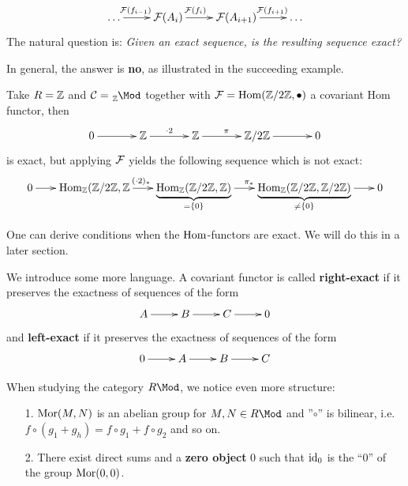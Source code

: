 \documentclass[twoside = false,	%
		headsepline,		%
		parskip = true,
		]{scrbook}						%
\begin{document}
        \begin{equation*}
            \xymatrix {
                \dots \ar^(.4){\cF(f_{i-1})}[r] & \cF(A_i)\ar^(.4){\cF(f_i)}[r] & \cF(A_{i+1})\ar^(.6){\cF(f_{i+1})}[r] & \dots
            }
        \end{equation*}
        The natural question is: \textit{Given an exact sequence, is the resulting sequence exact?}
        
        In general, the answer is \textbf{no}, as illustrated in the succeeding example.

        \begin{example*}{}
            Take $R=\mathbb Z$ and $\cC = \tensor[_\Z]{\Mod}{^{}}$ together with $\mathcal F = \mathrm{Hom}(\mathbb Z/2\mathbb Z,\bullet)$ a covariant Hom functor, then
            \begin{equation*}
                \xymatrix @C=35pt {
                    0 \ar[r] & \Z \ar[r]^{\cdot 2} & \Z \ar[r]^{\pi} & \Z/2 \Z \ar[r] & 0
                }
            \end{equation*}
            is exact, but applying $\mathcal F$ yields the following sequence which is not exact:
            \begin{equation*}
                \xymatrix @C=18pt {
                    0 \ar[r] & \Hom_\Z(\Z/2\Z,\Z \ar[r]^(.47){(\cdot 2)_*} & {\underbrace{\Hom_\Z(\Z/2\Z,\Z)}_{=\{0\}}} \ar[r]^{\pi_*} & {\underbrace{\Hom_\Z(\Z/2 \Z,\Z/2\Z)}_{ \neq\{0\}}} \ar[r] & 0
                }
            \end{equation*}
        \end{example*}
        One can derive conditions when the $\mathrm{Hom}$-functors are exact. We will do this in a later section.

        We introduce some more language. A covariant functor is called \textbf{right-exact} if it preserves the exactness of sequences of the form
        \begin{equation*}
            \xymatrix {
                A \ar[r] & B \ar[r] & C \ar[r] & 0
            }
        \end{equation*}
        and \textbf{left-exact} if it preserves the exactness of sequences of the form
        \begin{equation*}
            \xymatrix {
                 0 \ar[r] & A \ar[r] & B \ar[r] & C
            }
        \end{equation*}

         When studying the category $R\Mod$, we notice even more structure:
        
        \begin{itemize}
            \item[1.] $\mathrm{Mor}(M,N)$ is an abelian group for $M,N \in R\Mod$ and ''$\circ$'' is bilinear, i.e. $f \circ (g_1 + g_h) = f \circ g_1 + f \circ g_2$ and so on.
            \item[2.] There exist direct sums and a \textbf{zero object} $0$ such that $\mathrm{id}_0$ is the ``$0$'' of the group $ \mathrm{Mor}(0,0)$. 
        \end{itemize}
        
\end{document}
